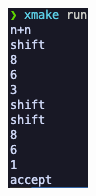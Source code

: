 \begin{figure}[htbp]
\begin{minipage}[t]{0.2\textwidth}
        \includegraphics[width=\textwidth]{images/lr_2.png}

\end{minipage}
\end{figure}

